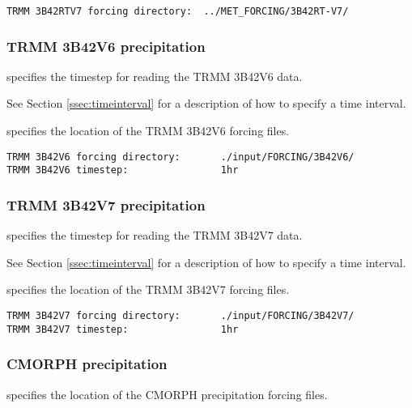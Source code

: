  \begin{Verbatim}[frame=single]
TRMM 3B42RTV7 forcing directory:  ../MET_FORCING/3B42RT-V7/
 \end{Verbatim}

 
 \subsubsection{TRMM 3B42V6 precipitation} \label{sssec:supp_3b42v6}
 

 
  specifies the timestep for reading
 the TRMM 3B42V6 data.

 See Section \ref{ssec:timeinterval} for a description
 of how to specify a time interval.

  specifies the location of the
 TRMM 3B42V6 forcing files.
 

 \begin{Verbatim}[frame=single]
TRMM 3B42V6 forcing directory:       ./input/FORCING/3B42V6/
TRMM 3B42V6 timestep:                1hr
 \end{Verbatim}

 
 \subsubsection{TRMM 3B42V7 precipitation} \label{sssec:supp_3b42v7}
 

 
  specifies the timestep for reading
 the TRMM 3B42V7 data.

 See Section \ref{ssec:timeinterval} for a description
 of how to specify a time interval.

  specifies the location of the
 TRMM 3B42V7 forcing files.
 

 \begin{Verbatim}[frame=single]
TRMM 3B42V7 forcing directory:       ./input/FORCING/3B42V7/
TRMM 3B42V7 timestep:                1hr
 \end{Verbatim}

 
 \subsubsection{CMORPH precipitation} \label{sssec:supp_cmorph}
 

 
  specifies the location of the
 CMORPH precipitation forcing files.
 


